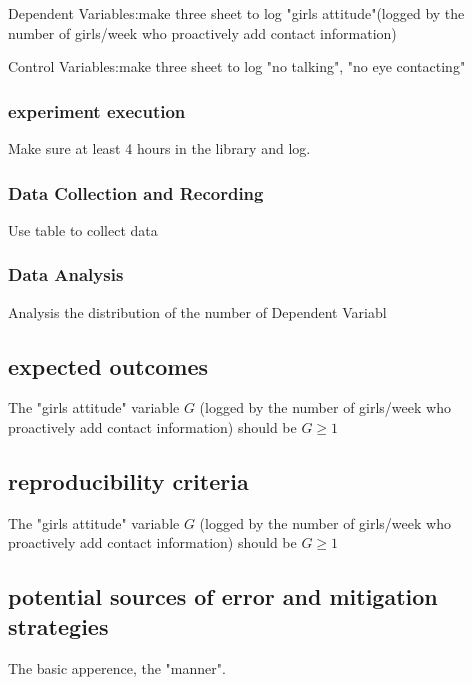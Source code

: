 \documentclass{article}
\begin{document}
Dependent Variables:make three sheet to log
"girls attitude"(logged by the number of girls/week
who proactively add contact information)

Control Variables:make three sheet to log
"no talking", "no eye contacting"
\subsubsection{experiment execution}
Make sure at least 4 hours in the library and log.

\subsubsection{Data Collection and Recording}
Use table to collect data
\subsubsection{Data Analysis}
Analysis the distribution of the number
of Dependent Variabl

\subsection{expected outcomes}
The "girls attitude" variable $G$
(logged by the number of girls/week
who proactively add contact information)
should be $G\geq1$


\subsection{reproducibility criteria}
The "girls attitude" variable $G$
(logged by the number of girls/week
who proactively add contact information)
should be $G\geq1$

\subsection{potential sources of error and mitigation strategies}
The basic apperence, the "manner".



\end{document}
